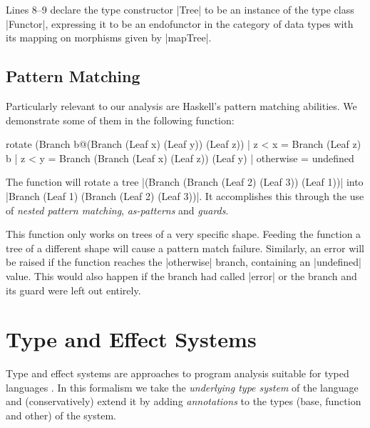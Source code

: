Lines 8--9 declare the type constructor |Tree| to be an instance of the type class |Functor|, expressing it to be an endofunctor in the category of data types with its mapping on morphisms given by |mapTree|.

\subsection{Pattern Matching}

Particularly relevant to our analysis are Haskell's pattern matching abilities. We demonstrate some of them in the following function:

\begin{code}
rotate (Branch b@(Branch (Leaf x) (Leaf y)) (Leaf z))
           | z < x      = Branch (Leaf z) b
           | z < y      = Branch (Branch (Leaf x) (Leaf z)) (Leaf y)
           | otherwise  = undefined
\end{code}

The function will rotate a tree |(Branch (Branch (Leaf 2) (Leaf 3)) (Leaf 1))| into |Branch (Leaf 1) (Branch (Leaf 2) (Leaf 3))|. It accomplishes this through the use of \emph{nested pattern matching}, \emph{as-patterns} and \emph{guards}.

This function only works on trees of a very specific shape. Feeding the function a tree of a different shape will cause a pattern match failure. Similarly, an error will be raised if the function reaches the |otherwise| branch, containing an |undefined| value. This would also happen if the branch had called |error| or the branch and its guard were left out entirely.


\section{Type and Effect Systems}

Type and effect systems are approaches to program analysis suitable for typed languages \cite{Nielson:1999:PPA:555142}. In this formalism we take the \emph{underlying type system} of the language and (conservatively) extend it by adding \emph{annotations} to the types (base, function and other) of the system.

